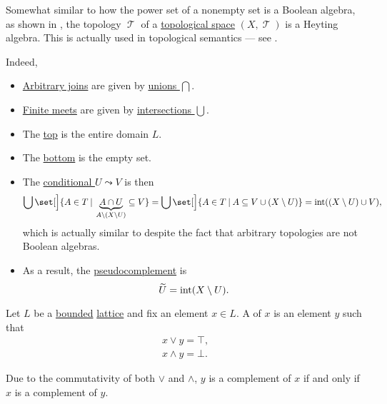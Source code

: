 \begin{example}\label{ex:topological_space_is_heyting_algebra}
  Somewhat similar to how the power set of a nonempty set is a Boolean algebra, as shown in , the topology \( \mscrT \) of a \hyperref[def:topological_space]{topological space} \( (X, \mscrT) \) is a Heyting algebra. This is actually used in topological semantics --- see .

  Indeed,
  \begin{itemize}
    \item \hyperref[def:semilattice/join]{Arbitrary joins} are given by \hyperref[def:basic_set_operations/union]{unions \( \bigcap \)}.
    \item \hyperref[def:semilattice/meet]{Finite meets} are given by \hyperref[def:basic_set_operations/intersection]{intersections \( \bigcup \)}.
    \item The \hyperref[def:extremal_points/top_and_bottom]{top} is the entire domain \( L \).
    \item The \hyperref[def:extremal_points/top_and_bottom]{bottom} is the empty set.
    \item The \hyperref[eq:def:heyting_algebra/conditional]{conditional \( U \leadsto V \)} is then
    \begin{equation*}
      \bigcup\set[\Big]{ A \in T \given \underbrace{A \cap U}_{A \setminus (X \setminus U)} \subseteq V }
      =
      \bigcup\set[\Big]{ A \in T \given A \subseteq V \cup (X \setminus U) }
      =
      \Int((X \setminus U) \cup V),
    \end{equation*}
    which is actually similar to  despite the fact that arbitrary topologies are not Boolean algebras.

    \item As a result, the \hyperref[def:heyting_algebra/pseudocomplement]{pseudocomplement} is
    \begin{equation*}
      \widetilde U = \operatorname{int}(X \setminus U).
    \end{equation*}
  \end{itemize}
\end{example}

\begin{definition}\label{def:bounded_lattice_complement}
  Let \( L \) be a \hyperref[def:semilattice/bounded]{bounded} \hyperref[def:semilattice/lattice]{lattice} and fix an element \( x \in L \). A  of \( x \) is an element \( y \) such that
  \begin{align}
    x \vee y = \top \label{def:bounded_lattice_complement/join}, \\
    x \wedge y = \bot \label{def:bounded_lattice_complement/meet}.
  \end{align}

  Due to the commutativity of both \( \vee \) and \( \wedge \), \( y \) is a complement of \( x \) if and only if \( x \) is a complement of \( y \).
\end{definition}

